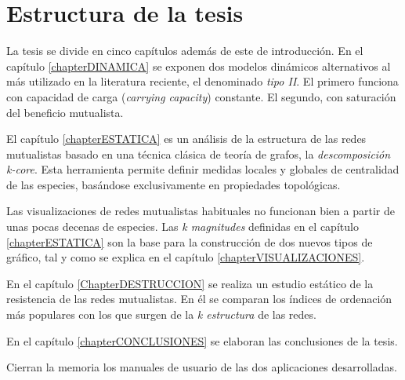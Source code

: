 \section{Estructura de la tesis}

La tesis se divide en cinco capítulos además de este de introducción. En el capítulo \ref{chapterDINAMICA} se exponen dos modelos dinámicos alternativos al más utilizado en la literatura reciente, el denominado \textit{tipo II}. El primero funciona con capacidad de carga (\textit{carrying capacity}) constante. El segundo, con saturación del beneficio mutualista.

El capítulo \ref{chapterESTATICA} es un análisis de la estructura de las redes mutualistas basado en una técnica clásica de teoría de grafos, la \textit{descomposición k-core}. Esta herramienta permite definir medidas locales y globales de centralidad de las especies, basándose exclusivamente en propiedades topológicas.

Las visualizaciones de redes mutualistas habituales no funcionan bien a partir de unas pocas decenas de especies. Las \textit{k magnitudes} definidas  en el capítulo \ref{chapterESTATICA} son la base para la construcción de dos nuevos tipos de gráfico, tal y como se explica en el capítulo \ref{chapterVISUALIZACIONES}.

En el capítulo \ref{ChapterDESTRUCCION} se realiza un estudio estático de la resistencia de las redes mutualistas. En él se comparan los índices de ordenación más populares con los que surgen de la \textit{k estructura} de las redes.

En el capítulo \ref{chapterCONCLUSIONES} se elaboran las conclusiones de la tesis.

Cierran la memoria los manuales de usuario de las dos aplicaciones desarrolladas.



